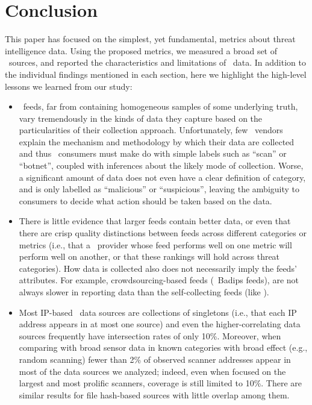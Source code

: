 \chapter{Conclusion}
\label{chapter:conclusion}

This paper has focused on the simplest, yet fundamental, metrics about
threat intelligence data. Using the proposed metrics, we measured a broad
set of \ti\ sources, and reported the characteristics and limitations of
\ti\ data. In addition to the individual findings mentioned in each section, here
we highlight the high-level lessons we learned from our study:


\begin{itemize}
	\item \ti\ feeds, far from containing
    homogeneous samples of some underlying truth, vary tremendously in the
    kinds of data they capture based on the particularities of their
    collection approach. Unfortunately, few \ti\ vendors explain the
    mechanism and methodology by which their data are collected and thus
    \ti\ consumers must make do with simple labels such as
    ``scan'' or ``botnet'', coupled with inferences about the
    likely mode of collection. Worse, a significant amount of data does not
    even have a clear definition of category, and is only labelled as
    ``malicious'' or ``suspicious'', leaving the ambiguity to consumers to
    decide what action should be taken based on the data.

    \item There is little evidence
    that larger feeds contain better data, or even that there are
    crisp quality distinctions between feeds across different categories
    or metrics (i.e., that a \ti\ provider whose feed performs well on one
    metric will perform well on another, or that these rankings will hold
    across threat categories). How data is collected also does not
    necessarily imply the feeds' attributes. For example, crowdsourcing-based feeds (\eg\ Badips feeds), are not always slower in reporting data
    than the self-collecting feeds (like \feedetiprep).

    \item Most IP-based \ti\ data sources are collections of
    singletons (i.e., that each IP address appears in at most one source)
    and even the higher-correlating data sources frequently have
    intersection rates of only 10\%. Moreover, when comparing with broad
    sensor data in known categories with broad effect (e.g., random
    scanning) fewer than 2\% of observed scanner addresses appear in most of
    the data sources we analyzed; indeed, even when focused on the largest
    and most prolific scanners, coverage is still limited to 10\%. There
    are similar results for file hash-based sources with little overlap
    among them.
\end{itemize}

